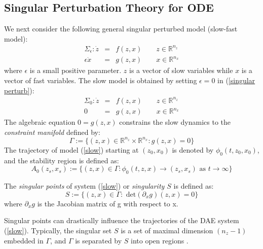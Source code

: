 \documentclass[journal]{IEEEtran}
\newcommand{\ee}{\epsilon}
\begin{document}
\subsection{Singular Perturbation Theory for ODE}
We next consider the following general singular perturbed model (slow-fast model):
\begin{eqnarray}\label{singular perturb}
\Sigma_\ee:\dot{z}&=&f(z,x)\qquad z\in\mathbb{R}^{n_z}\\
\ee\dot{x}&=&g(z,x)\qquad x\in\mathbb{R}^{n_x}\nonumber
\end{eqnarray}
where $\ee$ is a small positive parameter. $z$ is a vector of slow variables while $x$ is a vector of fast variables. 
The slow model is obtained by setting $\ee=0$ in (\ref{singular perturb}):\begin{eqnarray}\label{slow}
\Sigma_0:\dot{z}&=&f(z,x)\qquad z\in\mathbb{R}^{n_{z}}\\
0&=&g(z,x)\qquad x\in\mathbb{R}^{n_x}\nonumber
\end{eqnarray}
The algebraic equation $0=g(z,x)$ constrains the slow dynamics to the \textit{constraint manifold} defined by:
\begin{equation}
\Gamma:=\{(z,x)\in\mathbb{R}^{n_{z}}\times\mathbb{R}^{n_x}:g(z,x)=0\}
\end{equation}
The trajectory of model (\ref{slow}) starting at $(z_0,x_0)$ is denoted by $\phi_0(t,z_0,x_0)$, and the stability region is defined as:
\begin{equation}
A_0(z_s,x_s):=\{(z,x)\in\Gamma: \phi_0(t,z,x)\rightarrow(z_s,x_s)\mbox{ as }t\rightarrow\infty\}\nonumber
\end{equation}

The \textit{singular points} of system (\ref{slow}) or \textit{singularity $S$} is defined as:
\begin{equation}
S:=\{(z,x)\in\Gamma:\mbox{ det}(\partial_xg)(z,x)=0\}
\end{equation}
where $\partial_x g$ is the Jacobian matrix of g with respect to x.

Singular points can drastically influence the trajectories of the DAE system (\ref{slow}). Typically, the singular set $S$ is a set of maximal dimension $(n_z-1)$ embedded in $\Gamma$, and $\Gamma$ is separated by $S$ into open regions \cite{Veukatasubramanian:article}\cite{Alberto:article}.
\end{document}
